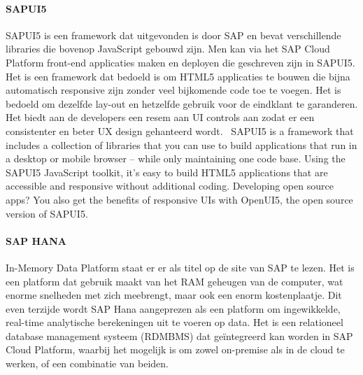 \paragraph{SAPUI5}
    SAPUI5 is een framework dat uitgevonden is door SAP en bevat verschillende libraries die bovenop JavaScript gebouwd zijn. Men kan via het SAP Cloud Platform front-end applicaties maken en deployen die geschreven zijn in SAPUI5. Het is een framework dat bedoeld is om HTML5 applicaties te bouwen die bijna automatisch responsive zijn zonder veel bijkomende code toe te voegen.
    Het is bedoeld om dezelfde lay-out en hetzelfde gebruik voor de eindklant te garanderen. Het biedt aan de developers een resem aan UI controls aan zodat er een consistenter en beter UX design gehanteerd wordt.~\autocite{SAPSEa} 
    SAPUI5 is a framework that includes a collection of libraries that you can use to build applications that run in a desktop or mobile browser – while only maintaining one code base. Using the SAPUI5 JavaScript toolkit, it’s easy to build HTML5 applications that are accessible and responsive without additional coding. Developing open source apps? You also get the benefits of responsive UIs with OpenUI5, the open source version of SAPUI5.

\paragraph{SAP HANA}
    In-Memory Data Platform staat er er als titel op de site van SAP te lezen. Het is een platform dat gebruik maakt van het RAM geheugen van de computer, wat enorme snelheden met zich meebrengt, maar ook een enorm kostenplaatje. Dit even terzijde wordt SAP Hana aangeprezen als een platform  om ingewikkelde, real-time analytische berekeningen uit te voeren op data.
    Het is een relationeel database management systeem (RDMBMS) dat geïntegreerd kan worden in SAP Cloud Platform, waarbij het mogelijk is om zowel on-premise als in de cloud te werken, of een combinatie van beiden. 

